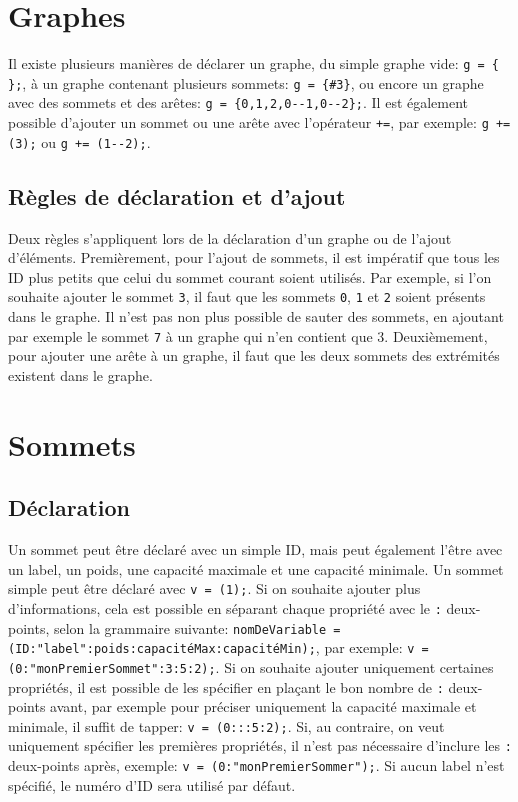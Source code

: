 \documentclass[french]{article}
\begin{document}
	\section{Graphes}
	Il existe plusieurs manières de déclarer un graphe, du simple graphe vide: \texttt{g = \{ \};}, à un graphe contenant plusieurs sommets: \texttt{g = \{\#3\}}, ou encore un graphe avec des sommets et des arêtes: \texttt{g = \{0,1,2,0-{}-1,0-{}-2\};}. Il est également possible d'ajouter un sommet ou une arête avec l'opérateur \texttt{+=}, par exemple: \texttt{g += (3);} ou \texttt{g += (1-{}-2);}.
	
		\subsection{Règles de déclaration et d'ajout}
		Deux règles s'appliquent lors de la déclaration d'un graphe ou de l'ajout d'éléments. Premièrement, pour l'ajout de sommets, il est impératif que tous les ID plus petits que celui du sommet courant soient utilisés. Par exemple, si l'on souhaite ajouter le sommet \texttt{3}, il faut que les sommets \texttt{0}, \texttt{1} et \texttt{2} soient présents dans le graphe. Il n'est pas non plus possible de sauter des sommets, en ajoutant par exemple le sommet \texttt{7} à un graphe qui n'en contient que 3.
		Deuxièmement, pour ajouter une arête à un graphe, il faut que les deux sommets des extrémités existent dans le graphe.
		
	\section{Sommets}
		\subsection{Déclaration}
		Un sommet peut être déclaré avec un simple ID, mais peut également l'être avec un label, un poids, une capacité maximale et une capacité minimale. Un sommet simple peut être déclaré avec \texttt{v = (1);}. Si on souhaite ajouter plus d'informations, cela est possible en séparant chaque propriété avec le \texttt{:} deux-points, selon la grammaire suivante: \texttt{nomDeVariable = (ID:"label":poids:capacitéMax:capacitéMin);}, par exemple: \texttt{v = (0:"monPremierSommet":3:5:2);}. Si on souhaite ajouter uniquement certaines propriétés, il est possible de les spécifier en plaçant le bon nombre de \texttt{:} deux-points avant, par exemple pour préciser uniquement la capacité maximale et minimale, il suffit de tapper: \texttt{v = (0:::5:2);}. Si, au contraire, on veut uniquement spécifier les premières propriétés, il n'est pas nécessaire d'inclure les \texttt{:} deux-points après, exemple: \texttt{v = (0:"monPremierSommer");}. Si aucun label n'est spécifié, le numéro d'ID sera utilisé par défaut.
		
\end{document}
